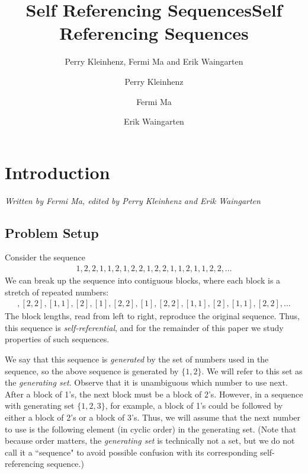 \documentclass[runningheads,a4paper]{llncs}
\title{Self Referencing Sequences}
\author{Perry Kleinhenz, Fermi Ma and Erik Waingarten}
\date{}							%
\begin{document}
\title{Self Referencing Sequences}

\author{Perry Kleinhenz \and Fermi Ma \and Erik Waingarten}
%


\maketitle

\section{Introduction}

\emph{Written by Fermi Ma, edited by Perry Kleinhenz and Erik Waingarten}

\subsection{Problem Setup}
Consider the sequence
\begin{align*}
1,2,2,1,1,2,1,2,2,1,2,2,1,1,2,1,1,2,2,\dots
\end{align*}
We can break up the sequence into contiguous blocks, where each block is a stretch of repeated numbers:
\begin{align*}
[1],[2,2],[1,1],[2],[1],[2,2],[1],[2,2],[1,1],[2],[1,1],[2,2],\dots
\end{align*}
The block lengths, read from left to right, reproduce the original sequence. Thus, this sequence is \emph{self-referential}, and for the remainder of this paper we study properties of such sequences. 

We say that this sequence is \emph{generated} by the set of numbers used in the sequence, so the above sequence is generated by $\{1,2\}$. We will refer to this set as the \emph{generating set}. Observe that it is unambiguous which number to use next. After a block of 1's, the next block must be a block of 2's. However, in a sequence with generating set $\{1,2,3\}$, for example, a block of 1's could be followed by either a block of 2's or a block of 3's. Thus, we will assume that the next number to use is the following element (in cyclic order) in the generating set. (Note that because order matters, the \emph{generating set} is technically not a set, but we do not call it a ``sequence" to avoid possible confusion with its corresponding self-referencing sequence.)
\end{document}
